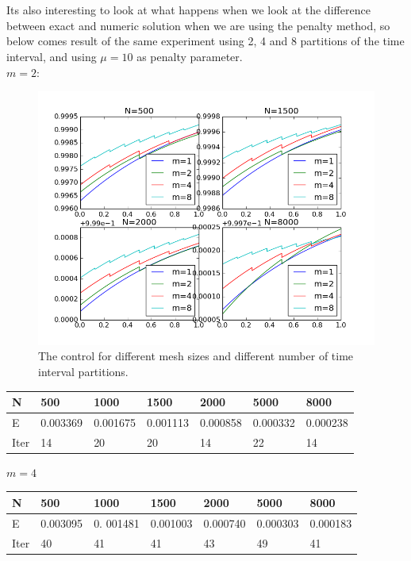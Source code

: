 \documentclass[11pt,a4paper]{article}
\begin{document}
\\
\\
Its also interesting to look at what happens when we look at the difference between exact and numeric solution when we are using the penalty method, so below comes result of the same experiment using 2, 4 and 8 partitions of the time interval, and using $\mu=10$ as penalty parameter.
\\
$m=2$:
\begin{figure}
  \includegraphics[width=\linewidth]{lin_manu_control.png}
  \caption{The control for different mesh sizes and different number of time interval partitions. }
  \label{Fig 3}
\end{figure}
\begin{center}
    \begin{tabular}{| l | l | l | l | l | l | l |}
    \hline
    N & 500 & 1000  & 1500 & 2000 & 5000 & 8000 \\ \hline
    E & 0.003369 & 0.001675 &0.001113 & 0.000858 & 0.000332 & 0.000238	\\ \hline
    Iter & 14 & 20  & 20 & 14 & 22 & 14 \\ \hline
    \end{tabular}
\end{center}
$m=4$
\begin{center}
    \begin{tabular}{| l | l | l | l | l | l | l |}
    \hline
    N & 500 & 1000  & 1500 & 2000 & 5000 & 8000 \\ \hline
    E & 0.003095 & 0. 001481& 0.001003 & 0.000740 & 0.000303 & 0.000183\\ \hline
    Iter & 40 & 41  & 41 & 43 & 49 & 41 \\ \hline
    \end{tabular}
\end{center}
\end{document}
